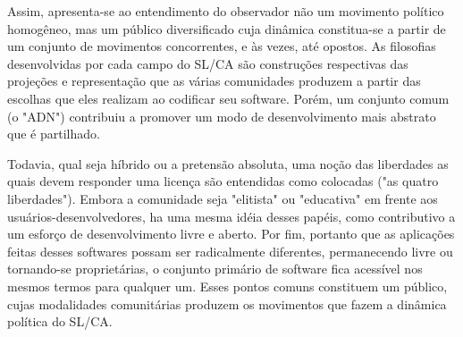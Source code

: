Assim, apresenta-se ao entendimento do observador não um movimento político homogêneo, mas um público diversificado cuja dinâmica constitua-se a partir de um conjunto de movimentos concorrentes, e às vezes, até opostos.  As filosofias desenvolvidas por cada campo do SL/CA são construções respectivas das projeções e representação que as várias comunidades produzem a partir das escolhas que eles realizam ao codificar seu software. Porém, um conjunto comum (o "ADN") contribuiu a promover um modo de desenvolvimento mais abstrato que é partilhado.

Todavia, qual seja híbrido ou a pretensão absoluta, uma noção das liberdades as quais devem responder uma licença são entendidas como colocadas ("as quatro liberdades"). Embora a comunidade seja "elitista" ou "educativa" em frente aos usuários-desenvolvedores, ha uma mesma idéia desses papéis, como contributivo a um esforço de desenvolvimento livre e aberto. Por fim, portanto que as aplicações feitas desses softwares possam ser radicalmente diferentes, permanecendo livre ou tornando-se proprietárias, o conjunto primário de software fica acessível nos mesmos termos para qualquer um. Esses pontos comuns constituem um público, cujas modalidades comunitárias produzem os movimentos que fazem a dinâmica política do SL/CA.

